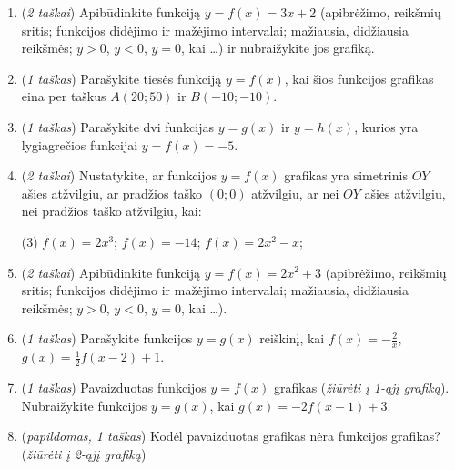 \documentclass[a4paper]{article}
\begin{document}
\begin{minipage}[t]{0.65\textwidth}
      \vspace*{-50mm} %
      \begin{enumerate}[itemsep=2mm, parsep=1mm, start=2]
            \item (\textit{2 taškai}) Apibūdinkite funkciją $y=f(x)=3x+2$ (apibrėžimo, reikšmių
                  sritis;
                  funkcijos didėjimo ir mažėjimo intervalai; mažiausia,
                  didžiausia
                  reikšmės; $y>0$, $y<0$, $y=0$, kai \ldots) ir nubraižykite
                  jos
                  grafiką.

            \item (\textit{1 taškas}) Parašykite tiesės funkciją $y=f(x)$, kai šios funkcijos
                  grafikas
                  eina per taškus $A(20; 50)$ ir $B(-10; -10)$.

            \item (\textit{1 taškas}) Parašykite dvi funkcijas $y=g(x)$ ir $y=h(x)$, kurios yra
                  lygiagrečios funkcijai $y=f(x)=-5$.

            \item (\textit{2 taškai}) Nustatykite, ar funkcijos $y=f(x)$ grafikas yra simetrinis
                  $OY$
                  ašies atžvilgiu, ar pradžios taško $(0; 0)$ atžvilgiu, ar nei
                  $OY$
                  ašies atžvilgiu, nei pradžios taško atžvilgiu, kai:

                  \begin{tasks}[item-format={\normalfont},
                              after-item-skip=2mm](3)
                        \task $f(x)=2x^3$;
                        \task $f(x)=-14$;
                        \task $f(x)=2x^2-x$;
                  \end{tasks}

            \item (\textit{2 taškai}) Apibūdinkite funkciją $y=f(x)=2x^2+3$ (apibrėžimo, reikšmių
                  sritis;
                  funkcijos didėjimo ir mažėjimo intervalai; mažiausia,
                  didžiausia
                  reikšmės; $y>0$, $y<0$, $y=0$, kai \ldots).

            \item (\textit{1 taškas}) Parašykite funkcijos $y=g(x)$ reiškinį, kai
                  $f(x)=-\frac{2}{x}$,
                  $g(x)=\frac{1}{2}f(x-2)+1$.

            \item (\textit{1 taškas}) Pavaizduotas funkcijos $y=f(x)$ grafikas (\textit{žiūrėti į 1-ąjį grafiką}). Nubraižykite
                  funkcijos
                  $y=g(x)$, kai $g(x)=-2f(x-1)+3$.

            \item (\textit{papildomas, 1 taškas}) Kodėl pavaizduotas grafikas
                  nėra funkcijos grafikas? (\textit{žiūrėti į 2-ąjį grafiką})
      \end{enumerate}
\end{minipage}
\end{document}
